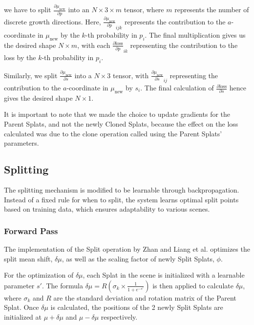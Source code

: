 \documentclass[11pt]{report}
\begin{document}
we have to split $\frac{\partial \mu_{\text{new}}}{\partial p}$ into an $N \times 3 \times m$ tensor, where $m$ represents the number of discrete growth directions. Here, $\frac{\partial \mu_{\text{new}}}{\partial p}_{ijk}$ represents the contribution to the $a$-coordinate in $\mu_{\text{new}}$ by the $k$-th probability in $p_i$. The final multiplication gives us the desired shape $N \times m$, with each $\frac{\partial \text{loss}}{\partial p}_{ik}$ representing the contribution to the loss by the $k$-th probability in $p_i$.

Similarly, we split $\frac{\partial \mu_{\text{new}}}{\partial s}$ into a $N \times 3$ tensor, with $\frac{\partial \mu_{\text{new}}}{\partial s}_{ij}$ representing the contribution to the $a$-coordinate in $\mu_{\text{new}}$ by $s_{i}$. The final calculation of $\frac{\partial \text{loss}}{\partial s}$ hence gives the desired shape $N \times 1$.

It is important to note that we made the choice to update gradients for the Parent Splats, and not the newly Cloned Splats, because the effect on the loss calculated was due to the clone operation called using the Parent Splats' parameters.

\subsection{Splitting}
The splitting mechanism is modified to be learnable through backpropagation. Instead of a fixed rule for when to split, the system learns optimal split points based on training data, which ensures adaptability to various scenes.

\subsubsection{Forward Pass}
The implementation of the Split operation by Zhan and Liang et al. optimizes the split mean shift, $\delta \mu$, as well as the scaling factor of newly Split Splats, $\phi$.

For the optimization of $\delta \mu$, each Splat in the scene is initialized with a learnable parameter $s'$. The formula $\delta \mu = R(\sigma_{k} \times \frac{1}{1 + e^{-s'}})$ is then applied to calculate $\delta \mu$, where $\sigma_{k}$ and $R$ are the standard deviation and rotation matrix of the Parent Splat. Once $\delta \mu$ is calculated, the positions of the 2 newly Split Splats are initialized at $\mu + \delta \mu$ and $\mu - \delta \mu$ respectively.
\end{document}
